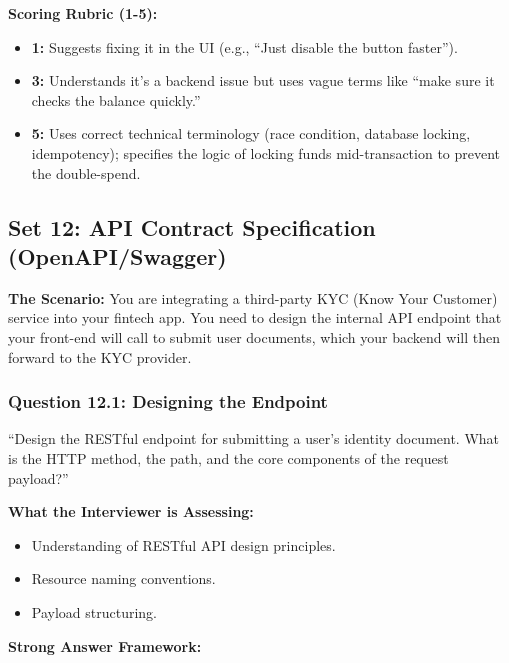 \documentclass[
  11pt,
  openany,
  oneside]{book}
\providecommand{\tightlist}{%
  \setlength{\itemsep}{0pt}\setlength{\parskip}{0pt}}
\begin{document}
\textbf{Scoring Rubric (1-5):}

\begin{itemize}
\tightlist
\item
  \textbf{1:} Suggests fixing it in the UI (e.g., ``Just disable the
  button faster'').
\item
  \textbf{3:} Understands it's a backend issue but uses vague terms like
  ``make sure it checks the balance quickly.''
\item
  \textbf{5:} Uses correct technical terminology (race condition,
  database locking, idempotency); specifies the logic of locking funds
  mid-transaction to prevent the double-spend.
\end{itemize}

\bigskip

\subsection{Set 12: API Contract Specification
(OpenAPI/Swagger)}\label{set-12-api-contract-specification-openapiswagger}

\textbf{The Scenario:} You are integrating a third-party KYC (Know Your
Customer) service into your fintech app. You need to design the internal
API endpoint that your front-end will call to submit user documents,
which your backend will then forward to the KYC provider.

\subsubsection{Question 12.1: Designing the
Endpoint}\label{question-12.1-designing-the-endpoint}

``Design the RESTful endpoint for submitting a user's identity document.
What is the HTTP method, the path, and the core components of the
request payload?''

\textbf{What the Interviewer is Assessing:}

\begin{itemize}
\tightlist
\item
  Understanding of RESTful API design principles.
\item
  Resource naming conventions.
\item
  Payload structuring.
\end{itemize}

\textbf{Strong Answer Framework:}
\end{document}
